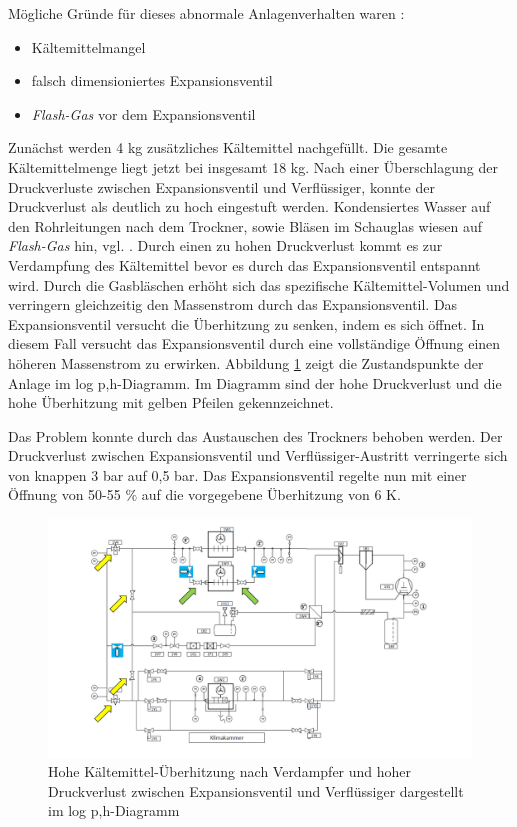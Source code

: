Mögliche Gründe für dieses abnormale Anlagenverhalten waren :

\begin{itemize}
\item Kältemittelmangel
\item falsch dimensioniertes Expansionsventil
\item \textit{Flash-Gas} vor dem Expansionsventil
\end{itemize}

Zunächst werden 4 kg zusätzliches Kältemittel nachgefüllt. Die gesamte Kältemittelmenge liegt jetzt bei insgesamt 18 kg. Nach einer Überschlagung der Druckverluste zwischen Expansionsventil und Verflüssiger, konnte der Druckverlust als deutlich zu hoch eingestuft werden. Kondensiertes Wasser auf den Rohrleitungen nach dem Trockner, sowie Bläsen im Schauglas wiesen auf \textit{Flash-Gas} hin, vgl. \citep{GAGKG2010}.
Durch einen zu hohen Druckverlust kommt es zur Verdampfung des Kältemittel bevor es durch das Expansionsventil entspannt wird. Durch die Gasbläschen erhöht sich das spezifische Kältemittel-Volumen und verringern gleichzeitig den Massenstrom durch das Expansionsventil. Das Expansionsventil versucht die Überhitzung zu senken, indem es sich öffnet. In diesem Fall versucht das Expansionsventil durch eine vollständige Öffnung einen höheren Massenstrom zu erwirken. Abbildung \ref{fig:Problem_Trockner} zeigt die Zustandspunkte der Anlage im log p,h-Diagramm. Im Diagramm sind der hohe Druckverlust und die hohe Überhitzung mit gelben Pfeilen gekennzeichnet. 

Das Problem konnte durch das Austauschen des Trockners behoben werden. Der Druckverlust zwischen Expansionsventil und Verflüssiger-Austritt verringerte sich von knappen 3 bar auf 0,5 bar. Das Expansionsventil regelte nun mit einer Öffnung von 50-55 $\%$ auf die vorgegebene Überhitzung von 6 K. 


\begin{figure}[h]
\centering		\includegraphics[page= 2,width=1.120\textwidth]{Pictures/Inbetriebnahme/Probleme.pdf}
\caption{Hohe Kältemittel-Überhitzung nach Verdampfer und hoher Druckverlust zwischen Expansionsventil und Verflüssiger dargestellt im log p,h-Diagramm}
\label{fig:Problem_Trockner}
\end{figure}

